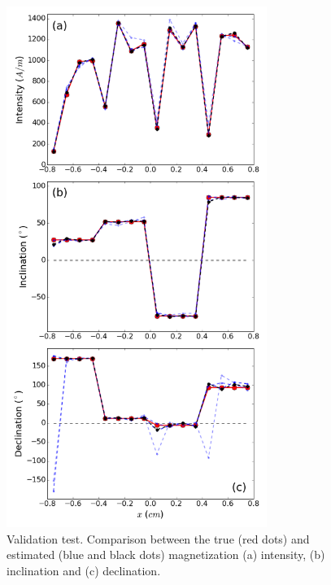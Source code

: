 \documentclass[draft,gc]{agutex}
\begin{document}
 \begin{figure}
 \noindent \includegraphics[width=20pc]{Figs/Fig6_LQ.png}
 \caption{Validation test. Comparison between the true (red dots)
 and estimated (blue and black dots) magnetization 
 (a) intensity, (b) inclination  and (c) declination.
}
\end{figure}
\end{document}
